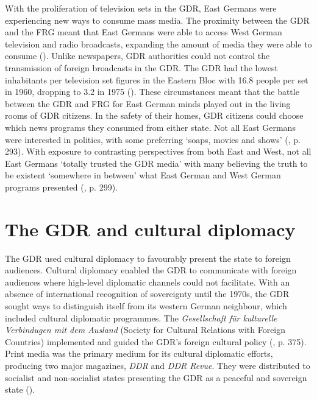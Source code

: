 With the proliferation of television sets in the GDR, East Germans were experiencing new ways to consume mass media. The proximity between the GDR and the FRG meant that East Germans were able to access West German television and radio broadcasts, expanding the amount of media they were able to consume (\cite{meyenschwer2007}). Unlike newspapers, GDR authorities could not control the transmission of foreign broadcasts in the GDR. The GDR had the lowest inhabitants per television set figures in the Eastern Bloc with 16.8 people per set in 1960, dropping to 3.2 in 1975 (\cite{lovell2017}). These circumstances meant that the battle between the GDR and FRG for East German minds played out in the living rooms of GDR citizens. In the safety of their homes, GDR citizens could choose which news programs they consumed from either state. Not all East Germans were interested in politics, with some preferring ‘soaps, movies and shows’ (\cite{meyenschwer2007}, p. 293). With exposure to contrasting perspectives from both East and West, not all East Germans ‘totally trusted the GDR media’ with many believing the truth to be existent ‘somewhere in between’ what East German and West German programs presented (\cite{meyenschwer2007}, p. 299).

\section*{The GDR and cultural diplomacy}

The GDR used cultural diplomacy to favourably present the state to foreign audiences. Cultural diplomacy enabled the GDR to communicate with foreign audiences where high-level diplomatic channels could not facilitate. With an absence of international recognition of sovereignty until the 1970s, the GDR sought ways to distinguish itself from its western German neighbour, which included cultural diplomatic programmes. The \textit{Gesellschaft für kulturelle Verbindugen mit dem Ausland} (Society for Cultural Relations with Foreign Countries) implemented and guided the GDR’s foreign cultural policy (\cite{hillaker2020}, p. 375). Print media was the primary medium for its cultural diplomatic efforts, producing two major magazines, \textit{DDR} and \textit{DDR Revue}. They were distributed to socialist and non-socialist states presenting the GDR as a peaceful and sovereign state (\cite{hillaker2020}).

